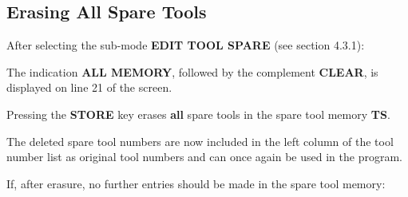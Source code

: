 \begin{itemize}
\end{itemize}


\newpage
\subsection{Erasing All Spare Tools}

After selecting the sub-mode \textbf{EDIT TOOL SPARE} (see section 4.3.1):

\begin{itemize}
\end{itemize}
\vspace{.5cm}

The indication \textbf{ALL MEMORY}, followed by the complement \textbf{CLEAR}, is displayed on line 21 of the screen.

\begin{itemize}
\end{itemize}
\vspace{.5cm}

Pressing the \textbf{STORE} key erases \textbf{all} spare tools in the spare tool memory \textbf{TS}.

The deleted spare tool numbers are now included in the left column of the tool number list as original tool numbers and can once again be used in the program.

If, after erasure, no further entries should be made in the spare tool memory:

\begin{itemize}
\end{itemize}
